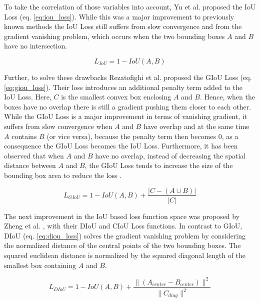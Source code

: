 To take the correlation of those variables into account, Yu et al. \cite{iou} proposed the \ac{IoU} Loss (eq. \ref{eq:iou_loss}).
While this was a major improvement to previously known methods the \ac{IoU} Loss still suffers from slow convergence and from the gradient vanishing problem, which occurs when the two bounding boxes $A$ and $B$ have no intersection.

\begin{equation}
    L_{IoU} = 1 - IoU(A, B)
    \label{eq:iou_loss}
\end{equation}

Further, to solve these drawbacks Rezatofighi et al. \cite{giou} proposed the \ac{GIoU} Loss (eq. \ref{eq:giou_loss}).
Their loss introduces an additional penalty term added to the \ac{IoU} Loss.
Here, $C$ is the smallest convex box enclosing $A$ and $B$.
Hence, when the boxes have no overlap there is still a gradient pushing them closer to each other.
While the \ac{GIoU} Loss is a major improvement in terms of vanishing gradient, it suffers from slow convergence when $A$ and $B$ have overlap and at the same time $A$ contains $B$ (or vice versa), because the penalty term then becomes $0$, as a consequence the \ac{GIoU} Loss becomes the \ac{IoU} Loss.
Furthermore, it has been observed that when $A$ and $B$ have no overlap, instead of decreasing the spatial distance between $A$ and $B$, the \ac{GIoU} Loss tends to increase the size of the bounding box area to reduce the loss \cite{eiou}.

\begin{equation}
    L_{GIoU} = 1 - IoU(A, B) + \frac{|C - (A \cup B)|}{|C|}
    \label{eq:giou_loss}
\end{equation}

The next improvement in the \ac{IoU} based loss function space was proposed by Zheng et al. \cite{diou}, with their \ac{DIoU} and \ac{CIoU} Loss functions.
In contrast to \ac{GIoU}, \ac{DIoU} (eq. \ref{eq:diou_loss}) solves the gradient vanishing problem by considering the normalized distance of the central points of the two bounding boxes.
The squared euclidean distance is normalized by the squared diagonal length of the smallest box containing $A$ and $B$.

\begin{equation}
    L_{DIoU} = 1 - IoU(A, B) + \frac{\|(A_{center} - B_{center})\|^2}{\|C_{diag}\|^2}
    \label{eq:diou_loss}
\end{equation}


